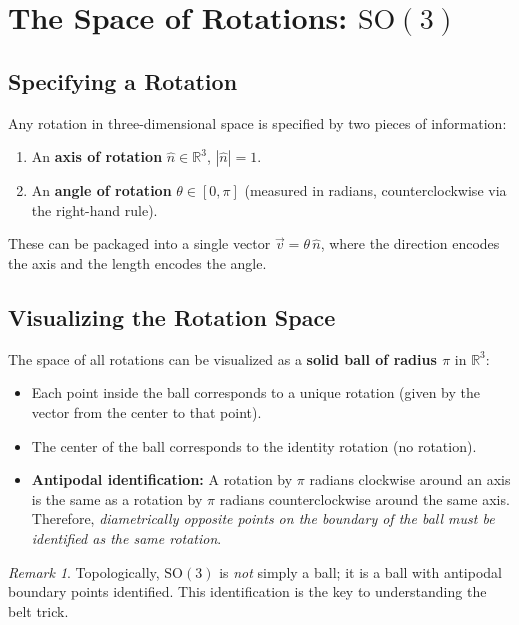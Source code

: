 \documentclass[11pt,a4paper]{article}
\theoremstyle{definition}
\theoremstyle{plain}
\theoremstyle{remark}
\newtheorem{remark}{Remark}[section]
\begin{document}
\section{The Space of Rotations: $\mathrm{SO}(3)$}

\subsection{Specifying a Rotation}

Any rotation in three-dimensional space is specified by two pieces of information:
\begin{enumerate}
    \item An \textbf{axis of rotation} $\hat{n} \in \mathbb{R}^3$, $|\hat{n}| = 1$.
    \item An \textbf{angle of rotation} $\theta \in [0, \pi]$ (measured in radians, counterclockwise via the right-hand rule).
\end{enumerate}

These can be packaged into a single vector $\vec{v} = \theta\,\hat{n}$, where the direction encodes the axis and the length encodes the angle.

\subsection{Visualizing the Rotation Space}

The space of all rotations can be visualized as a \textbf{solid ball of radius $\pi$} in $\mathbb{R}^3$:
\begin{itemize}
    \item Each point inside the ball corresponds to a unique rotation (given by the vector from the center to that point).
    \item The center of the ball corresponds to the identity rotation (no rotation).
    \item \textbf{Antipodal identification:} A rotation by $\pi$ radians clockwise around an axis is the same as a rotation by $\pi$ radians counterclockwise around the same axis. Therefore, \emph{diametrically opposite points on the boundary of the ball must be identified as the same rotation}.
\end{itemize}

\begin{remark}
    Topologically, $\mathrm{SO}(3)$ is \emph{not} simply a ball; it is a ball with antipodal boundary points identified. This identification is the key to understanding the belt trick.
\end{remark}
\end{document}
